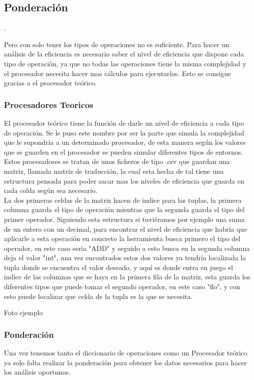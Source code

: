 \subsection{Ponderación}.

Pero con solo tener los tipos de operaciones no es suficiente. Para hacer un análisis de la eficiencia es necesario saber el nivel de eficiencia que dispone cada tipo de operación, ya que no todas las operaciones tiene la misma complejidad y el procesador necesita hacer mas cálculos para ejecutarlos. Esto se consigue gracias a el procesador teórico.\\

\subsubsection{Procesadores Teoricos}
El procesador teórico tiene la función de darle un nivel de eficiencia a cada tipo de operación. Se le puso este nombre por ser la parte que simula la complejidad que le supondría a un determinado procesador, de esta manera según los valores que se guarden en el procesador se pueden simular diferentes tipos de entornos.\\

Estos procesadores se tratan de unos ficheros de tipo .csv que guardan una matriz, llamada matriz de traducción, la cual esta hecha de tal tiene una estructura pensada para poder sacar mas los  niveles de eficiencia  que guarda en cada celda según sea necesario.\\

La dos primeras celdas de la matriz hacen de indice para las tuplas, la primera columna guarda el tipo de operación mientras que la segunda guarda el tipo del primer operador. Siguiendo esta estructura si tuviéramos por ejemplo una suma de un entero con un decimal, para encontrar el nivel de eficiencia que habría que aplicarle a esta operación en concreto la herramienta busca primero el tipo del operador, en este caso seria "ADD" y seguido a  esto busca en la segunda columna deja el valor "int", una vez  encontrados  estos dos valores ya tendría localizada la tupla donde se encuentra  el valor  deseado, y aquí es donde  entra en juego el indice de las  columnas que se haya en la primera fila de la matriz, esta  guarda los diferentes tipos que puede tomar el segundo operador, en este caso "flo", y con esto puede localizar que celda de la tupla es la que se necesita.

Foto ejemplo

\subsubsection{Ponderación}
Una vez tenemos tanto el diccionario de operaciones como un Procesador teórico ya solo falta realizar la ponderación para obtener los datos necesarios para hacer los análisis oportunos. 

